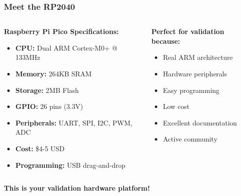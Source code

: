 \documentclass{beamer}
\begin{document}
\begin{frame}
\frametitle{Meet the RP2040}
\begin{columns}
\begin{column}{0.6\textwidth}
\textbf{Raspberry Pi Pico Specifications:}
\begin{itemize}
    \item \textbf{CPU:} Dual ARM Cortex-M0+ @ 133MHz
    \item \textbf{Memory:} 264KB SRAM
    \item \textbf{Storage:} 2MB Flash
    \item \textbf{GPIO:} 26 pins (3.3V)
    \item \textbf{Peripherals:} UART, SPI, I2C, PWM, ADC
    \item \textbf{Cost:} \$4-5 USD
    \item \textbf{Programming:} USB drag-and-drop
\end{itemize}
\end{column}
\begin{column}{0.4\textwidth}
\textbf{Perfect for validation because:}
\begin{itemize}
    \item Real ARM architecture
    \item Hardware peripherals
    \item Easy programming
    \item Low cost
    \item Excellent documentation
    \item Active community
\end{itemize}
\end{column}
\end{columns}

\vspace{0.5cm}
\begin{center}
\textbf{This is your validation hardware platform!}
\end{center}
\end{frame}
\end{document}
